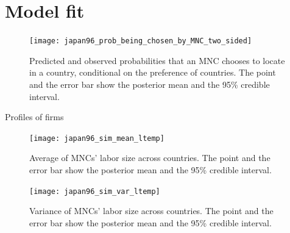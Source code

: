 \section{Model fit}
\label{sec:model_fit}

\begin{figure}[!ht] \centering
\texttt{[image: japan96\_prob\_being\_chosen\_by\_MNC\_two\_sided]}
  \caption{Predicted and observed probabilities that an MNC chooses to locate in
a country, conditional on the preference of countries. The point and the error
bar show the posterior mean and the 95\% credible interval.}
  \label{fig:japan96_prob_being_chosen_by_MNC_two_sided}
\end{figure}

Profiles of firms

\begin{figure}[!ht] \centering
\texttt{[image: japan96\_sim\_mean\_ltemp]}
  \caption{Average of MNCs' labor size across countries. The point and the error
bar show the posterior mean and the 95\% credible interval.}
  \label{fig:japan96_sim_mean_ltemp}
\end{figure}

\begin{figure}[!ht] \centering
\texttt{[image: japan96\_sim\_var\_ltemp]}
  \caption{Variance of MNCs' labor size across countries. The point and the
error bar show the posterior mean and the 95\% credible interval.}
  \label{fig:japan96_sim_var_ltemp}
\end{figure}

